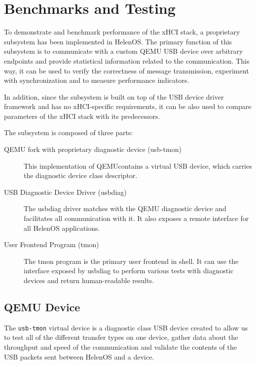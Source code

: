 \chapter{Benchmarks and Testing}
\label{appendix:testing}

To demonstrate and benchmark performance of the xHCI stack, a proprietary
subsystem has been implemented in HelenOS. The primary function of this
subsystem is to communicate with a custom QEMU USB device over arbitrary
endpoints and provide statistical information related to the communication.
This way, it can be used to verify the correctness of message transmission,
experiment with synchronization and to measure performance indicators.

In addition, since the subsystem is built on top of the USB device driver
framework and has no xHCI-specific requirements, it can be also used to compare
parameters of the xHCI stack with its predecessors.

The subsystem is composed of three parts:
%
\begin{description}
	\item[QEMU fork with proprietary diagnostic device (usb-tmon)]
		This implementation of QEMU\break contains a virtual USB device, which carries
		the diagnostic device class descriptor.
	\item[USB Diagnostic Device Driver (usbdiag)]
		The usbdiag driver matches with the QEMU diagnostic device and
		facilitates all communication with it. It also exposes a remote
		interface for all HelenOS applications.
	\item[User Frontend Program (tmon)]
		The tmon program is the primary user frontend in shell. It can use the
		interface exposed by usbdiag to perform various tests with diagnostic
		devices and return human-readable results.
\end{description}


\section{QEMU Device}
\label{sec:tmon}

The \texttt{usb-tmon} virtual device is a diagnostic class USB device
created to allow us to test all of the different transfer types on one device,
gather data about the throughput and speed of the communication and validate
the contents of the USB packets sent between HelenOS and a device.

